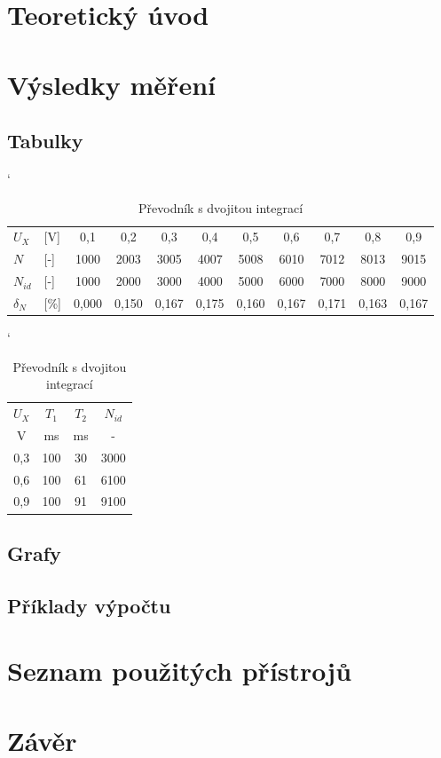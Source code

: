 \documentclass[a4paper, czech]{article}
\begin{document}
\section{Teoretický úvod}

\section{Výsledky měření}

\subsection{Tabulky}

\begin{table}[H]
    \catcode`
    \centering
    \caption{Převodník s dvojitou integrací}
    \begin{tabular}{ll|ccccccccc}
        \toprule
        $U_X$  & [V]  & 0,1   & 0,2   & 0,3   & 0,4   & 0,5   & 0,6   & 0,7   & 0,8   & 0,9   \\
        \cmidrule(rl){1-11}
        $N$   & [-]  & 1000  & 2003  & 3005  & 4007  & 5008  & 6010  & 7012  & 8013  & 9015  \\
        $N_{id}$ & [-]  & 1000  & 2000  & 3000  & 4000  & 5000  & 6000  & 7000  & 8000  & 9000  \\
        $\delta_N$  & [\%] & 0,000 & 0,150 & 0,167 & 0,175 & 0,160 & 0,167 & 0,171 & 0,163 & 0,167 \\
        \bottomrule
    \end{tabular}
\end{table}

\begin{table}[H]
    \catcode`
    \centering
    \caption{Převodník s dvojitou integrací}
    \begin{tabular}{cccc}
        \toprule
        $U_X$  & $T_1$  & $T_2$ & $N_{id}$  \\
        \cmidrule(rl){1-1}
        \cmidrule(rl){2-2}
        \cmidrule(rl){3-3}
        \cmidrule(rl){4-4}
        V   & ms  & ms & -    \\
        \midrule
        0,3 & 100 & 30 & 3000 \\
        0,6 & 100 & 61 & 6100 \\
        0,9 & 100 & 91 & 9100 \\
        \bottomrule
    \end{tabular}
\end{table}

\subsection{Grafy}

\subsection{Příklady výpočtu}

\section{Seznam použitých přístrojů}

\section{Závěr}
\end{document}
